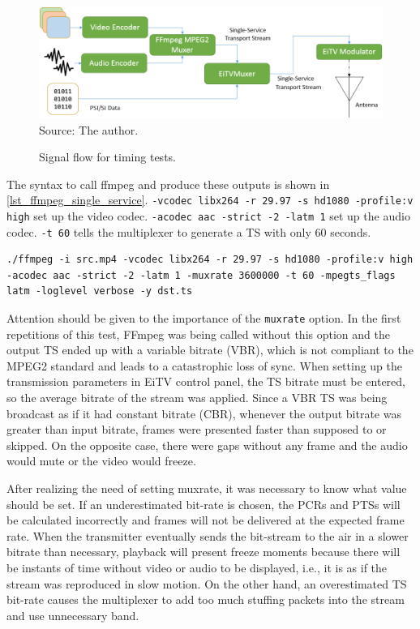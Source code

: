 \documentclass[
	12pt,				%
	openright,			%
	twoside,			%
	a4paper,			%
	brazil,
	french,				%
	english
	]{abntex2}
\begin{document}
\begin{figure}[!hb]
\centering
\caption{Signal flow for timing tests.}
\includegraphics[width=0.9\linewidth]{figuras/test_scn_timing.png}
\\Source: The author.
\label{fig:test_scn_timing}
\end{figure}

The syntax to call ffmpeg and produce these outputs is shown in \autoref{lst_ffmpeg_single_service}. \texttt{-vcodec libx264 -r 29.97 -s hd1080 -profile:v high} set up the video codec. \texttt{-acodec aac -strict -2 -latm 1} set up the audio codec. \texttt{-t 60} tells the multiplexer to generate a TS with only 60 seconds.

\begin{lstlisting}[caption={}, label={lst_ffmpeg_single_service}]
./ffmpeg -i src.mp4 -vcodec libx264 -r 29.97 -s hd1080 -profile:v high -acodec aac -strict -2 -latm 1 -muxrate 3600000 -t 60 -mpegts_flags latm -loglevel verbose -y dst.ts
\end{lstlisting}

Attention should be given to the importance of the \texttt{muxrate} option. In the first repetitions of this test, FFmpeg was being called without this option and the output TS ended up with a variable bitrate (VBR), which is not compliant to the MPEG2 standard and leads to a catastrophic loss of sync. When setting up the transmission parameters in EiTV control panel, the TS bitrate must be entered, so the average bitrate of the stream was applied. Since a VBR TS was being broadcast as if it had constant bitrate (CBR), whenever the output bitrate was greater than input bitrate, frames were presented faster than supposed to or skipped. On the opposite case, there were gaps without any frame and the audio would mute or the video would freeze.

After realizing the need of setting muxrate, it was necessary to know what value should be set. If an underestimated bit-rate is chosen, the PCRs and PTSs will be calculated incorrectly and frames will not be delivered at the expected frame rate. When the transmitter eventually sends the bit-stream to the air in a slower bitrate than necessary, playback will present freeze moments because there will be instants of time without video or audio to be displayed, i.e., it is as if the stream was reproduced in slow motion. On the other hand, an overestimated TS bit-rate causes the multiplexer to add too much stuffing packets into the stream and use unnecessary band.
\end{document}
